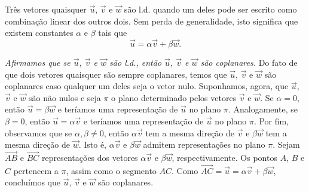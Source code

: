 Três vetores quaisquer $\vec{u}$, $\vec{v}$ e $\vec{w}$ são l.d. quando um deles pode ser escrito como combinação linear dos outros dois. Sem perda de generalidade, isto significa que existem constantes $\alpha$ e $\beta$ tais que
\begin{equation}
  \vec{u} = \alpha\vec{v} + \beta\vec{w}.
\end{equation}

\emph{Afirmamos que se $\vec{u}$, $\vec{v}$ e $\vec{w}$ são l.d., então $\vec{u}$, $\vec{v}$ e $\vec{w}$ são coplanares.} Do fato de que dois vetores quaisquer são sempre coplanares, temos que $\vec{u}$, $\vec{v}$ e $\vec{w}$ são coplanares caso qualquer um deles seja o vetor nulo. Suponhamos, agora, que $\vec{u}$, $\vec{v}$ e $\vec{w}$ são não nulos e seja $\pi$ o plano determinado pelos vetores $\vec{v}$ e $\vec{w}$. Se $\alpha = 0$, então $\vec{u} = \beta\vec{w}$ e teríamos uma representação de $\vec{u}$ no plano $\pi$. Analogamente, se $\beta=0$, então $\vec{u} = \alpha\vec{v}$ e teríamos uma representação de $\vec{u}$ no plano $\pi$. Por fim, observamos que se $\alpha,\beta\neq 0$, então $\alpha\vec{v}$ tem a mesma direção de $\vec{v}$ e $\beta\vec{w}$ tem a mesma direção de $\vec{w}$. Isto é, $\alpha\vec{v}$ e $\beta\vec{w}$ admitem representações no plano $\pi$. Sejam $\overrightarrow{AB}$ e $\overrightarrow{BC}$ representações dos vetores $\alpha\vec{v}$ e $\beta\vec{w}$, respectivamente. Os pontos $A$, $B$ e $C$ pertencem a $\pi$, assim como o segmento $AC$. Como $\overrightarrow{AC} = \vec{u} = \alpha\vec{v} + \beta\vec{w}$, concluímos que $\vec{u}$, $\vec{v}$ e $\vec{w}$ são coplanares.

